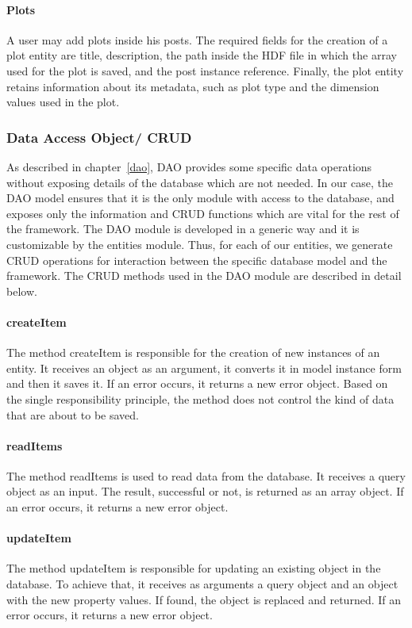 \paragraph{Plots}
A user may add plots inside his posts. The required fields for the creation of a plot entity are title, description, the path inside the HDF file in which the array used for the plot is saved, and the post instance reference. Finally, the plot entity retains information about its metadata, such as plot type and the dimension values used in the plot.

\subsubsection{Data Access Object/ CRUD}
\label{daocrud}
As described in chapter~\ref{dao}, DAO provides some specific data operations without exposing details of the database which are not needed. In our case, the DAO model ensures that it is the only module with access to the database, and exposes only the information and CRUD functions which are vital for the rest of the framework. The DAO module is developed in a generic way and it is customizable by the entities module. Thus, for each of our entities, we generate CRUD operations for interaction between the specific database model and the framework. The CRUD methods used in the DAO module are described in detail below.

\paragraph{createItem}
The method createItem is responsible for the creation of new instances of an entity. It receives an object as an argument, it converts it in model instance form and then it saves it. If an error occurs, it returns a new error object. Based on the single responsibility principle, the method does not control the kind of data that are about to be saved.
\paragraph{readItems}
The method readItems is used to read data from the database. It receives a query object as an input. The result, successful or not, is returned as an array object. If an error occurs, it returns a new error object.
\paragraph{updateItem}
The method updateItem is responsible for updating an existing object in the database. To achieve that, it receives as arguments a query object and an object with the new property values. If found, the object is replaced and returned. If an error occurs, it returns a new error object.
